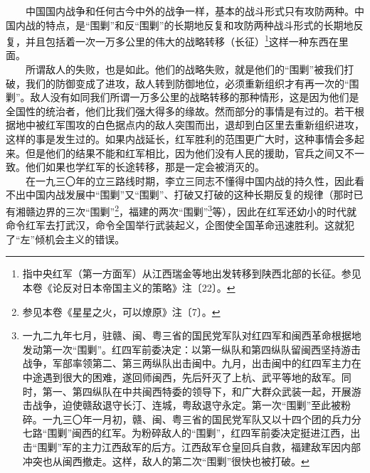 \documentclass[cn,11pt,chinese]{elegantbook}
\begin{document}
　　中国国内战争和任何古今中外的战争一样，基本的战斗形式只有攻防两种。中国内战的特点，是“围剿”和反“围剿”的长期地反复和攻防两种战斗形式的长期地反复，并且包括着一次一万多公里的伟大的战略转移（长征）\footnote[16]{ 指中央红军（第一方面军）从江西瑞金等地出发转移到陕西北部的长征。参见本卷《论反对日本帝国主义的策略》注〔22〕。}这样一种东西在里面。\\
　　所谓敌人的失败，也是如此。他们的战略失败，就是他们的“围剿”被我们打破，我们的防御变成了进攻，敌人转到防御地位，必须重新组织才有再一次的“围剿”。敌人没有如同我们所谓一万多公里的战略转移的那种情形，这是因为他们是全国性的统治者，他们比我们强大得多的缘故。然而部分的事情是有过的。若干根据地中被红军围攻的白色据点内的敌人突围而出，退却到白区里去重新组织进攻，这样的事是发生过的。如果内战延长，红军胜利的范围更广大时，这种事情会多起来。但是他们的结果不能和红军相比，因为他们没有人民的援助，官兵之间又不一致。他们如果也学红军的长途转移，那是一定会被消灭的。\\
　　在一九三〇年的立三路线时期，李立三同志不懂得中国内战的持久性，因此看不出中国内战发展中“围剿”又“围剿”、打破又打破的这种长期反复的规律（那时已有湘赣边界的三次“围剿”\footnote[17]{ 参见本卷《星星之火，可以燎原》注〔7〕。}，福建的两次“围剿”\footnote[18]{ 一九二九年七月，驻赣、闽、粤三省的国民党军队对红四军和闽西革命根据地发动第一次“围剿”。红四军前委决定：以第一纵队和第四纵队留闽西坚持游击战争，军部率领第二、第三两纵队出击闽中。九月，出击闽中的红四军主力在中途遇到很大的困难，遂回师闽西，先后歼灭了上杭、武平等地的敌军。同时，第一、第四纵队在中共闽西特委的领导下，和广大群众武装一起，开展游击战争，迫使赣敌退守长汀、连城，粤敌退守永定。第一次“围剿”至此被粉碎。一九三〇年一月初，赣、闽、粤三省的国民党军队又以十四个团的兵力分七路“围剿”闽西的红军。为粉碎敌人的“围剿”，红四军前委决定挺进江西，出击“围剿”军的主力江西敌军的后方。江西敌军仓皇回兵自救，福建敌军因内部冲突也从闽西撤走。这样，敌人的第二次“围剿”很快也被打破。}等），因此在红军还幼小的时代就命令红军去打武汉，命令全国举行武装起义，企图使全国革命迅速胜利。这就犯了“左”倾机会主义的错误。\\
\end{document}
